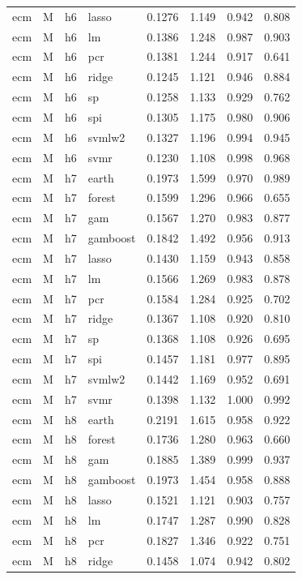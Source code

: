 \begin{ThreePartTable}
\begin{longtable}[t]{llclcccc}
ecm & M & h6 & lasso & 0.1276 & 1.149 & 0.942 & 0.808\\
ecm & M & h6 & lm & 0.1386 & 1.248 & 0.987 & 0.903\\
ecm & M & h6 & pcr & 0.1381 & 1.244 & 0.917 & 0.641\\
ecm & M & h6 & ridge & 0.1245 & 1.121 & 0.946 & 0.884\\
ecm & M & h6 & sp & 0.1258 & 1.133 & 0.929 & 0.762\\
ecm & M & h6 & spi & 0.1305 & 1.175 & 0.980 & 0.906\\
ecm & M & h6 & svmlw2 & 0.1327 & 1.196 & 0.994 & 0.945\\
ecm & M & h6 & svmr & 0.1230 & 1.108 & 0.998 & 0.968\\
\addlinespace
ecm & M & h7 & earth & 0.1973 & 1.599 & 0.970 & 0.989\\
ecm & M & h7 & forest & 0.1599 & 1.296 & 0.966 & 0.655\\
ecm & M & h7 & gam & 0.1567 & 1.270 & 0.983 & 0.877\\
ecm & M & h7 & gamboost & 0.1842 & 1.492 & 0.956 & 0.913\\
ecm & M & h7 & lasso & 0.1430 & 1.159 & 0.943 & 0.858\\
ecm & M & h7 & lm & 0.1566 & 1.269 & 0.983 & 0.878\\
ecm & M & h7 & pcr & 0.1584 & 1.284 & 0.925 & 0.702\\
ecm & M & h7 & ridge & 0.1367 & 1.108 & 0.920 & 0.810\\
ecm & M & h7 & sp & 0.1368 & 1.108 & 0.926 & 0.695\\
ecm & M & h7 & spi & 0.1457 & 1.181 & 0.977 & 0.895\\
ecm & M & h7 & svmlw2 & 0.1442 & 1.169 & 0.952 & 0.691\\
ecm & M & h7 & svmr & 0.1398 & 1.132 & 1.000 & 0.992\\
\addlinespace
ecm & M & h8 & earth & 0.2191 & 1.615 & 0.958 & 0.922\\
ecm & M & h8 & forest & 0.1736 & 1.280 & 0.963 & 0.660\\
ecm & M & h8 & gam & 0.1885 & 1.389 & 0.999 & 0.937\\
ecm & M & h8 & gamboost & 0.1973 & 1.454 & 0.958 & 0.888\\
ecm & M & h8 & lasso & 0.1521 & 1.121 & 0.903 & 0.757\\
ecm & M & h8 & lm & 0.1747 & 1.287 & 0.990 & 0.828\\
ecm & M & h8 & pcr & 0.1827 & 1.346 & 0.922 & 0.751\\
ecm & M & h8 & ridge & 0.1458 & 1.074 & 0.942 & 0.802\\

\end{longtable}
\end{ThreePartTable}
